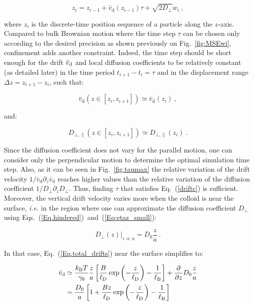 \begin{equation}
	z_i = z_{i-1} + \bar{v}_\mathrm{d}(z_{i-1}) \tau + \sqrt{2D_\bot}w_i ~,
	\label{eq.langevinnearz}
\end{equation}

 where $z_i$ is the discrete-time position sequence of a particle along the $z$-axis. Compared to bulk Brownian motion where the time step $\tau$ can be chosen only according to the desired precision as shown previously on Fig.~\ref{fig:MSEwi}, confinement adds another constraint. Indeed, the time step should be short enough for the drift $\bar{v}_\textnormal{d}$ and local diffusion coefficients to be relatively constant (as detailed later) in the time period $t_{i+1} - t_i = \tau$ and in the displacement range $\Delta z = z_{i+1} - z_i$, such that:

\begin{equation}
	\bar{v}_\mathrm{d} (z \in [z_i, z_{i+1}]) \simeq \bar{v}_\mathrm{d} (z_i) ~,
	\label{driftc}
\end{equation}

and:

\begin{equation}
	D_{\bot, \parallel}(z \in [z_i, z_{i+1}]) \simeq D_{\bot, \parallel}(z_i) ~.
\end{equation}

Since the diffusion coefficient does not vary for the parallel motion, one can consider only the perpendicular motion to determine the optimal simulation time step. Also, as it can be seen in Fig.~\ref{fig.taumax} the relative variation of the drift velocity $1/\bar{v}_\mathrm{d} \partial_z \bar{v}_\mathrm{d}$ reaches higher values than the relative variation of the diffusion coefficient $1/D_\bot \partial_z D_\bot$. Thus, finding $\tau$ that satisfies Eq.~(\ref{driftc}) is sufficient. Moreover, the vertical drift velocity varies more when the colloid is near the surface, \textit{i.e.} in the region where one can approximate the diffusion coefficient $D_\bot$ using Eqs.~(\ref{Eq.hindered})~and~(\ref{Eq:etaz_small}):

\begin{equation}
	\left.D_\bot  (z)\right|_{z\ll a} = D_ 0 \frac{z}{a} ~.
	\label{Dsmall}
\end{equation}

In that case, Eq.~(\ref{Eq.total_drifts}) near the surface simplifies to:

\begin{equation}
	\begin{aligned}
		\bar{v}_\textnormal{d} &\simeq  \frac{k_\mathrm{B}T}{\gamma_0} \frac{z}{a} \left[\frac{B}{\ell_\mathrm{D}} \exp \left(-\frac{z}{\ell_\mathrm{D}}\right) - \frac{1}{\ell_{\mathrm{B}}}  \right] + \frac{\partial}{\partial z} D_0 \frac{z}{a} \\
		&= \frac{D_0}{a} \left[ 1 + \frac{Bz}{\ell_\mathrm{D}} \exp \left(-\frac{z}{\ell_\mathrm{D}}\right)- \frac{1}{\ell_{\mathrm{B}}}\right]
	\end{aligned}
\end{equation}

